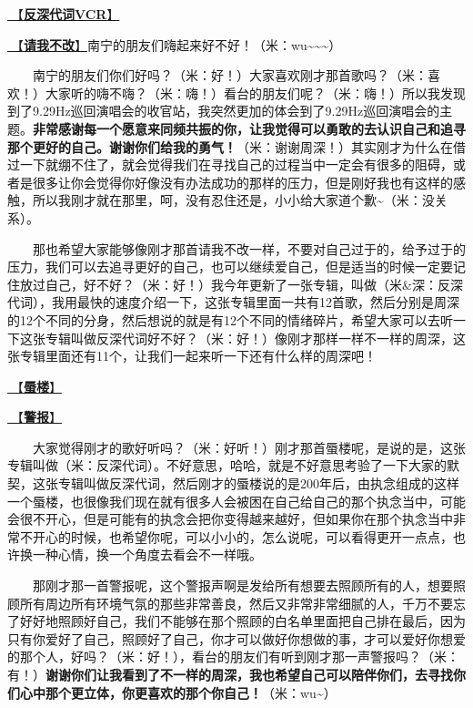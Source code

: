 \documentclass[]{ctexbook}
\begin{document}
\hyperref[senself-vcr]{🎥【\textbf{反深代词VCR}】}

\hyperref[brave-heart]{🎵【\textbf{请我不改}】}南宁的朋友们嗨起来好不好！（米：wu\textasciitilde\textasciitilde\textasciitilde）

  南宁的朋友们你们好吗？（米：好！）大家喜欢刚才那首歌吗？（米：喜欢！）大家听的嗨不嗨？（米：嗨！）看台的朋友们呢？（米：嗨！）所以我发现到了9.29Hz巡回演唱会的收官站，我突然更加的体会到了9.29Hz巡回演唱会的主题。\textbf{非常感谢每一个愿意来同频共振的你，让我觉得可以勇敢的去认识自己和追寻那个更好的自己。谢谢你们给我的勇气！}（米：谢谢周深！）其实刚才为什么在借过一下就绷不住了，就会觉得我们在寻找自己的过程当中一定会有很多的阻碍，或者是很多让你会觉得你好像没有办法成功的那样的压力，但是刚好我也有这样的感触，所以我刚才就在那里，呵，没有忍住还是，小小给大家道个歉\textasciitilde（米：没关系）。

  那也希望大家能够像刚才那首请我不改一样，不要对自己过于的，给予过于的压力，我们可以去追寻更好的自己，也可以继续爱自己，但是适当的时候一定要记住放过自己，好不好？（米：好！）我今年更新了一张专辑，叫做（米\&深：反深代词），我用最快的速度介绍一下，这张专辑里面一共有12首歌，然后分别是周深的12个不同的分身，然后想说的就是有12个不同的情绪碎片，希望大家可以去听一下这张专辑叫做反深代词好不好？（米：好！）像刚才那样一样不一样的周深，这张专辑里面还有11个，让我们一起来听一下还有什么样的周深吧！

\hyperref[mirage]{🎵【\textbf{蜃楼}】}

\hyperref[the-giver]{🎵【\textbf{警报}】}

  大家觉得刚才的歌好听吗？（米：好听！）刚才那首蜃楼呢，是说的是，这张专辑叫做（米：反深代词）。不好意思，哈哈，就是不好意思考验了一下大家的默契，这张专辑叫做反深代词，然后刚才的蜃楼说的是200年后，由执念组成的这样一个蜃楼，也很像我们现在就有很多人会被困在自己给自己的那个执念当中，可能会很不开心，但是可能有的执念会把你变得越来越好，但如果你在那个执念当中非常不开心的时候，也希望你呢，可以小小的，怎么说呢，可以看得更开一点点，也许换一种心情，换一个角度去看会不一样哦。

  那刚才那一首警报呢，这个警报声啊是发给所有想要去照顾所有的人，想要照顾所有周边所有环境气氛的那些非常善良，然后又非常非常细腻的人，千万不要忘了好好地照顾好自己，我们不能够在那个照顾的白名单里面把自己排在最后，因为只有你爱好了自己，照顾好了自己，你才可以做好你想做的事，才可以爱好你想爱的那个人，好吗？（米：好！），看台的朋友们有听到刚才那一声警报吗？（米：有！）\textbf{谢谢你们让我看到了不一样的周深，我也希望自己可以陪伴你们，去寻找你们心中那个更立体，你更喜欢的那个你自己！}（米：wu\textasciitilde）
\end{document}
